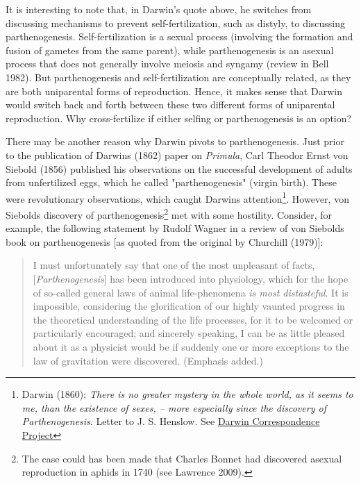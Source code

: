 \documentclass[
  11pt,
  letterpaper,
]{scrbook}
\begin{document}
It is interesting to note that, in Darwin's quote above, he switches
from discussing mechanisms to prevent self-fertilization, such as
distyly, to discussing parthenogenesis. Self-fertilization is a sexual
process (involving the formation and fusion of gametes from the same
parent), while parthenogenesis is an asexual process that does not
generally involve meiosis and syngamy (review in Bell 1982). But
parthenogenesis and self-fertilization are conceptually related, as they
are both uniparental forms of reproduction. Hence, it makes sense that
Darwin would switch back and forth between these two different forms of
uniparental reproduction. Why cross-fertilize if either selfing or
parthenogenesis is an option?

There may be another reason why Darwin pivots to parthenogenesis. Just
prior to the publication of Darwin\textquotesingle s (1862) paper on
\emph{Primula}, Carl Theodor Ernst von Siebold (1856) published his
observations on the successful development of adults from unfertilized
eggs, which he called "parthenogenesis" (virgin birth). These were
revolutionary observations, which caught Darwin\textquotesingle s
attention\footnote{Darwin (1860): \emph{There is no greater mystery in
  the whole world, as it seems to me, than the existence of sexes, --
  more especially since the discovery of Parthenogenesis}. Letter to J.
  S. Henslow. See
  \href{https://www.darwinproject.ac.uk/letter/DCP-LETT-2860.xml}{Darwin
  Correspondence Project}}. However, von Siebold\textquotesingle s
discovery of parthenogenesis\footnote{The case could has been made that
  Charles Bonnet had discovered asexual reproduction in aphids in 1740
  (see Lawrence 2009).} met with some hostility. Consider, for example,
the following statement by Rudolf Wagner in a review of von
Siebold\textquotesingle s book on parthenogenesis {[}as quoted from the
original by Churchill (1979){]}:

\begin{quote}
I must unfortunately say that one of the most unpleasant of facts,
{[}\emph{Parthenogenesis}{]} has been introduced into physiology, which
for the hope of so-called general laws of animal life-phenomena \emph{is
most distasteful}. It is impossible, considering the glorification of
our highly vaunted progress in the theoretical understanding of the life
processes, for it to be welcomed or particularly encouraged; and
sincerely speaking, I can be as little pleased about it as a physicist
would be if suddenly one or more exceptions to the law of gravitation
were discovered. (Emphasis added.)
\end{quote}
\end{document}
